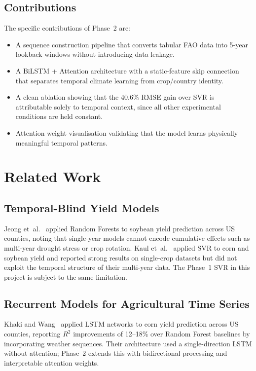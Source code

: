 \documentclass[conference]{IEEEtran}
\begin{document}
\subsection{Contributions}
The specific contributions of Phase~2 are:
\begin{itemize}
    \item A sequence construction pipeline that converts tabular FAO data into
          5-year lookback windows without introducing data leakage.
    \item A BiLSTM + Attention architecture with a static-feature skip connection
          that separates temporal climate learning from crop/country identity.
    \item A clean ablation showing that the 40.6\% RMSE gain over SVR is
          attributable solely to temporal context, since all other experimental
          conditions are held constant.
    \item Attention weight visualisation validating that the model learns
          physically meaningful temporal patterns.
\end{itemize}

\section{Related Work}
\label{sec:lit}

\subsection{Temporal-Blind Yield Models}
Jeong et~al.~\cite{jeong2016} applied Random Forests to soybean yield prediction
across US counties, noting that single-year models cannot encode cumulative effects
such as multi-year drought stress or crop rotation.
Kaul et~al.~\cite{kaul2005} applied SVR to corn and soybean yield and reported
strong results on single-crop datasets but did not exploit the temporal structure
of their multi-year data.
The Phase~1 SVR in this project is subject to the same limitation.

\subsection{Recurrent Models for Agricultural Time Series}
Khaki and Wang~\cite{khaki2019} applied LSTM networks to corn yield prediction
across US counties, reporting $R^{2}$ improvements of 12--18\% over Random Forest
baselines by incorporating weather sequences.
Their architecture used a single-direction LSTM without attention; Phase~2 extends
this with bidirectional processing and interpretable attention weights.
\end{document}
